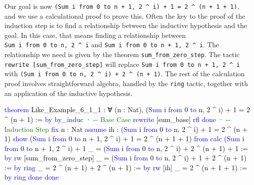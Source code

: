 \documentclass[
  letterpaper,
  DIV=11,
  numbers=noendperiod]{scrreprt}
\newenvironment{Shaded}{\begin{snugshade}}{\end{snugshade}}
\newcommand{\CommentTok}[1]{\textcolor[rgb]{0.37,0.37,0.37}{#1}}
\newcommand{\KeywordTok}[1]{\textcolor[rgb]{0.00,0.23,0.31}{#1}}
\newcommand{\NormalTok}[1]{\textcolor[rgb]{0.00,0.23,0.31}{#1}}
\renewcommand{\NormalTok}[1]{\textcolor[HTML]{000000}{#1}}
\renewcommand{\KeywordTok}[1]{\textcolor[HTML]{0000FF}{#1}}
\renewcommand{\CommentTok}[1]{\textcolor[HTML]{008000}{#1}}
\theoremstyle{remark}
\begin{document}
Our goal is now
\texttt{(Sum\ i\ from\ 0\ to\ n\ +\ 1,\ 2\ \^{}\ i)\ +\ 1\ =\ 2\ \^{}\ (n\ +\ 1\ +\ 1)},
and we use a calculational proof to prove this. Often the key to the
proof of the induction step is to find a relationship between the
inductive hypothesis and the goal. In this case, that means finding a
relationship between \texttt{Sum\ i\ from\ 0\ to\ n,\ 2\ \^{}\ i} and
\texttt{Sum\ i\ from\ 0\ to\ n\ +\ 1,\ 2\ \^{}\ i}. The relationship we
need is given by the theorem \texttt{sum\_from\_zero\_step}. The tactic
\texttt{rewrite\ {[}sum\_from\_zero\_step{]}} will replace
\texttt{Sum\ i\ from\ 0\ to\ n\ +\ 1,\ 2\ \^{}\ i} with
\texttt{(Sum\ i\ from\ 0\ to\ n,\ 2\ \^{}\ i)\ +\ 2\ \^{}\ (n\ +\ 1)}.
The rest of the calculation proof involves straightforward algebra,
handled by the \texttt{ring} tactic, together with an application of the
inductive hypothesis.

\begin{Shaded}
\begin{Highlighting}[]
\KeywordTok{theorem}\NormalTok{ Like\_Example\_6\_1\_1 :}
\NormalTok{    ∀ (n : Nat), (}\KeywordTok{Sum}\NormalTok{ i }\KeywordTok{from}\NormalTok{ 0 }\KeywordTok{to}\NormalTok{ n, 2 \^{} i) + 1 = 2 \^{} (n + 1) := }\KeywordTok{by}
  \KeywordTok{by\_induc}
\NormalTok{  · }\CommentTok{{-}{-} Base Case}
    \KeywordTok{rewrite}\NormalTok{ [sum\_base]}
    \KeywordTok{rfl}
    \KeywordTok{done}
\NormalTok{  · }\CommentTok{{-}{-} Induction Step}
    \KeywordTok{fix}\NormalTok{ n : Nat}
    \KeywordTok{assume}\NormalTok{ ih : (}\KeywordTok{Sum}\NormalTok{ i }\KeywordTok{from}\NormalTok{ 0 }\KeywordTok{to}\NormalTok{ n, 2 \^{} i) + 1 = 2 \^{} (n + 1)}
    \KeywordTok{show}\NormalTok{ (}\KeywordTok{Sum}\NormalTok{ i }\KeywordTok{from}\NormalTok{ 0 }\KeywordTok{to}\NormalTok{ n + 1, 2 \^{} i) + 1 = 2 \^{} (n + 1 + 1) }\KeywordTok{from}
      \KeywordTok{calc}\NormalTok{ (}\KeywordTok{Sum}\NormalTok{ i }\KeywordTok{from}\NormalTok{ 0 }\KeywordTok{to}\NormalTok{ n + 1, 2 \^{} i) + 1}
\NormalTok{        \_ = (}\KeywordTok{Sum}\NormalTok{ i }\KeywordTok{from}\NormalTok{ 0 }\KeywordTok{to}\NormalTok{ n, 2 \^{} i) + 2 \^{} (n + 1) + 1 := }\KeywordTok{by}
              \KeywordTok{rw}\NormalTok{ [sum\_from\_zero\_step]}
\NormalTok{        \_ = (}\KeywordTok{Sum}\NormalTok{ i }\KeywordTok{from}\NormalTok{ 0 }\KeywordTok{to}\NormalTok{ n, 2 \^{} i) + 1 + 2 \^{} (n + 1) := }\KeywordTok{by} \KeywordTok{ring}
\NormalTok{        \_ = 2 \^{} (n + 1) + 2 \^{} (n + 1) := }\KeywordTok{by} \KeywordTok{rw}\NormalTok{ [ih]}
\NormalTok{        \_ = 2 \^{} (n + 1 + 1) := }\KeywordTok{by} \KeywordTok{ring}
    \KeywordTok{done}
  \KeywordTok{done}
\end{Highlighting}
\end{Shaded}
\end{document}

